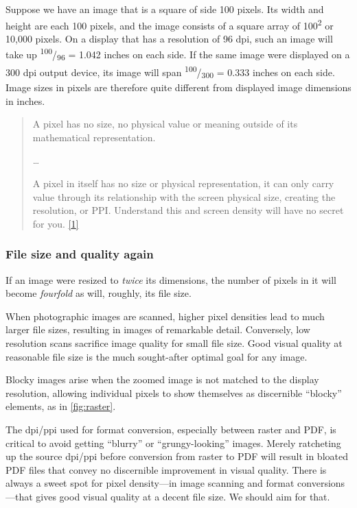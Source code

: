 \documentclass[
  12pt,
  british,
  a4paper,
  rgb,
  dvipsnames,
  svgnames,
  hyphens]{article}
\begin{document}
Suppose we have an image that is a square of side 100 pixels. Its width
and height are each 100 pixels, and the image consists of a square array
of 100\textsuperscript{2} or 10,000 pixels. On a display that has a
resolution of 96 dpi, such an image will take up
\textsuperscript{100}/\textsubscript{96} = 1.042 inches on each side. If
the same image were displayed on a 300 dpi output device, its image will
span \textsuperscript{100}/\textsubscript{300} = 0.333 inches on each
side. Image sizes in pixels are therefore quite different from displayed
image dimensions in inches.

\begin{quote}
A pixel has no size, no physical value or meaning outside of its
mathematical representation.

\ldots{}

A pixel in itself has no size or physical representation, it can only
carry value through its relationship with the screen physical size,
creating the resolution, or PPI. Understand this and screen density will
have no secret for you. \protect\hyperlink{ref-gabriel2017}{{[}1{]}}
\end{quote}

\hypertarget{file-size-and-quality-again}{%
\subsubsection{File size and quality
again}\label{file-size-and-quality-again}}

If an image were resized to \emph{twice} its dimensions, the number of
pixels in it will become \emph{fourfold} as will, roughly, its file
size.

When photographic images are scanned, higher pixel densities lead to
much larger file sizes, resulting in images of remarkable detail.
Conversely, low resolution scans sacrifice image quality for small file
size. Good visual quality at reasonable file size is the much
sought-after optimal goal for any image.

Blocky images arise when the zoomed image is not matched to the display
resolution, allowing individual pixels to show themselves as discernible
``blocky'' elements, as in \cref{fig:raster}.

The dpi/ppi used for format conversion, especially between raster and
PDF, is critical to avoid getting ``blurry'' or ``grungy-looking''
images. Merely ratcheting up the source dpi/ppi before conversion from
raster to PDF will result in bloated PDF files that convey no
discernible improvement in visual quality. There is always a sweet spot
for pixel density---in image scanning and format conversions---that
gives good visual quality at a decent file size. We should aim for that.
\end{document}
